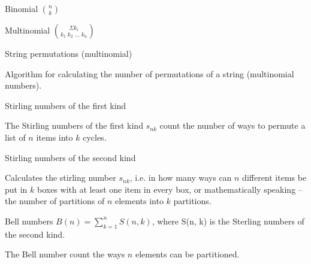 

\begin{algorithm}{Binomial $\binom{n}{k}$}
\end{algorithm}

\begin{algorithm}{Multinomial $\binom{\Sigma k_i}{k_1\;k_2\;\ldots\;k_n}$}
\end{algorithm}

\begin{algorithm}{String permutations (multinomial)}

Algorithm for calculating the number of permutations of a string
(multinomial numbers).
\end{algorithm}

\begin{algorithm}{Stirling numbers of the first kind}

The Stirling numbers of the first kind $s_{nk}$ count the number of ways to permute a list of $n$ items into $k$ cycles. 
\end{algorithm}

\begin{algorithm}{Stirling numbers of the second kind}

Calculates the stirling number $s_{nk}$, i.e. in how many ways can $n$
different items be put in $k$ boxes with at least one item in every box, or
mathematically speaking -- the number of partitions of $n$ elements into
$k$ partitions.
\end{algorithm}

\begin{algorithm}{Bell numbers}
\keyword{} $B(n) = \sum_{k=1}^n S(n,k)$, where S(n, k) is the Sterling numbers of the second kind.

The Bell number count the ways $n$ elements can be partitioned.
\end{algorithm}


